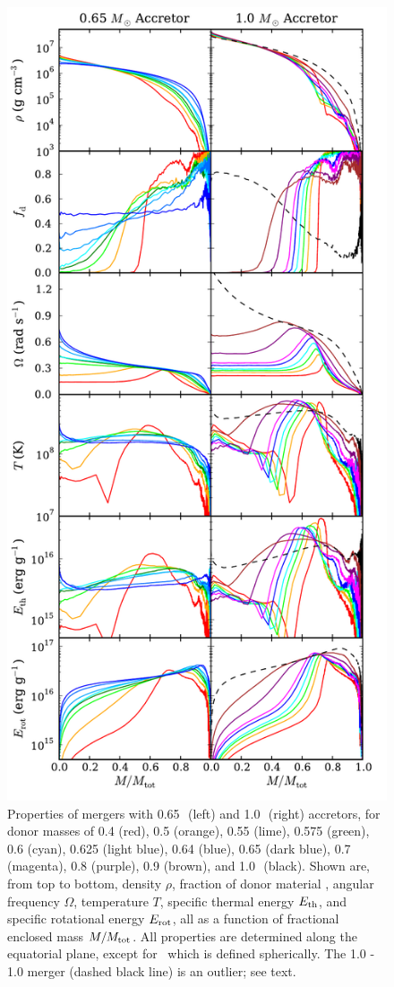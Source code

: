 \begin{figure}
\centering
\includegraphics[angle=0,width=0.6\columnwidth]{chapter2_zhu+13/figures/constaccretorcomp.pdf}
\caption{Properties of mergers with 0.65\,\Msun\ (left) and 1.0\,\Msun\ (right) accretors, for donor masses of 0.4 (red), 0.5 (orange), 0.55 (lime), 0.575 (green), 0.6 (cyan), 0.625 (light blue), 0.64 (blue), 0.65 (dark blue), 0.7 (magenta), 0.8 (purple), 0.9 (brown), and 1.0\,\Msun\ (black).  Shown are, from top to bottom, density $\rho$, fraction of donor material \fdon, angular frequency $\Omega$, temperature $T$, specific thermal energy $E_{\rm th}$, and specific rotational energy $E_{\rm rot}$, all as a function of fractional enclosed mass $M/M_{\rm tot}$.  All properties are determined along the equatorial plane, except for \fdon\ which is defined spherically.  The 1.0 - 1.0 {\Msun} merger (dashed black line) is an outlier; see text.}
\label{fig:c2_constacc}
\end{figure}

